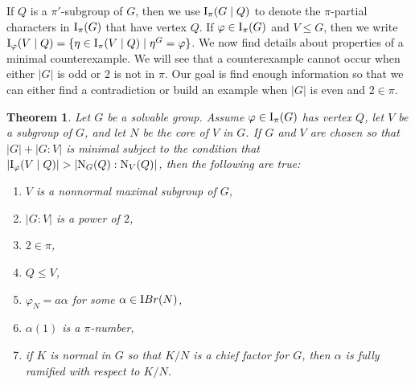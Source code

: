\documentclass[12pt]{article}
\newtheorem{theorem}{Theorem}%
\def\ibr#1{{\textrm IBr} (#1)}
\def\norm#1#2{{\textrm N}_{#1} (#2)}
\def\I#1#2{{\textrm I}_{#1} (#2)}
\def\Ipi#1{\I {\pi}{#1}}
\def\phi{\varphi}
\newcommand \IIpi[3] {{\textrm I}_{#1} (#2 \mid #3)}
\begin{document}
If $Q$ is a $\pi'$-subgroup of $G$, then we use $\Ipi {G \mid Q}$ to
denote the $\pi$-partial characters in $\Ipi G$ that have vertex
$Q$.  If $\phi \in \Ipi G$ and $V \le G$, then we write $\IIpi
{\phi}VQ = \{ \eta \in \Ipi {V \mid Q} \mid \eta^G = \phi \}$.  We
now find details about properties of a minimal counterexample.  We
will see that a counterexample cannot occur when either $|G|$ is odd
or $2$ is not in $\pi$.  Our goal is find enough information so that
we can either find a contradiction or build an example when $|G|$ is
even and $2 \in \pi$.

\begin{theorem} \label{min counter}
Let $G$ be a solvable group.  Assume $\phi \in \Ipi G$ has vertex
$Q$, let $V$ be a subgroup of $G$, and let $N$ be the core of $V$ in
$G$. If $G$ and $V$ are chosen so that $|G| + |G:V|$ is minimal
subject to the condition that $|\IIpi {\phi}VQ| > |\norm GQ:\norm
VQ|$, then the following are true:

\begin{enumerate}
\item $V$ is a nonnormal maximal subgroup of $G$,
\item $|G:V|$ is a power of $2$,
\item $2 \in \pi$,
\item $Q \le V$,
\item $\phi_N = a \alpha$ for some $\alpha \in \ibr N$,
\item $\alpha (1)$ is a $\pi$-number,
\item if $K$ is normal in $G$ so that $K/N$ is a chief factor for
$G$, then $\alpha$ is fully ramified with respect to $K/N$.
\end{enumerate}
\end{theorem}
\end{document}
